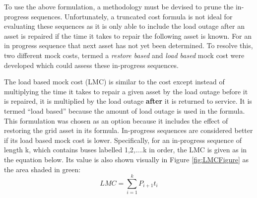 \documentclass[12pt]{article}
\begin{document}
To use the above formulation, a methodology must be devised to prune the in-progress sequences. Unfortunately, a truncated cost formula is not ideal for evaluating these sequences as it is only able to include the load outage after an asset is repaired if the time it takes to repair the following asset is known. For an in progress sequence that next asset has not yet been determined. To resolve this, two different mock costs, termed a \textit{restore based} and \textit{load based} mock cost were developed which could assess these in-progress sequences. \par
The load based mock cost (LMC) is similar to the cost except instead of multiplying the time it takes to repair a given asset by the load outage before it is repaired, it is multiplied by the load outage \textbf{after} it is returned to service. It is termed “load based” because the amount of load outage is used in the formula. This formulation was chosen as an option because it includes the effect of restoring the grid asset in its formula. In-progress sequences are considered better if its load based mock cost is lower. Specifically, for an in-progress sequence of length k, which contains buses labelled 1,2,....k in order, the LMC is given as in the equation below. Its value is also shown visually in Figure \ref{fig:LMCFigure} as the area shaded in green:
\begin{equation} 
    LMC =\sum_{i=1}^{k}{P_{i+1}t_i}
    \label{eq:ldmockcost}
\end{equation}
\end{document}
